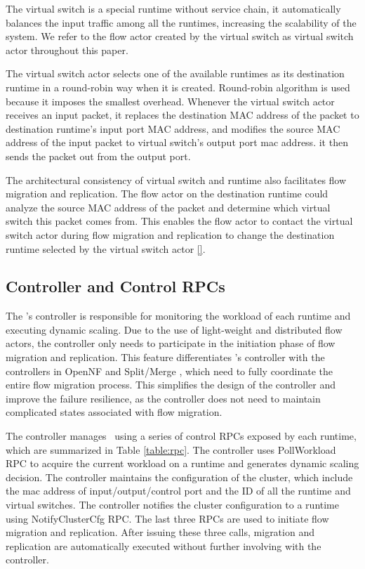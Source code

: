 The virtual switch is a special runtime without service chain, it automatically balances the input traffic among all the runtimes, increasing the scalability of the system. We refer to the flow actor created by the virtual switch as virtual switch actor throughout this paper.

The virtual switch actor selects one of the available runtimes as its destination runtime in a round-robin way when it is created. Round-robin algorithm is used because it imposes the smallest overhead. Whenever the virtual switch actor receives an input packet, it replaces the destination MAC address of the packet to destination runtime's input port MAC address, and modifies the source MAC address of the input packet to virtual switch's output port mac address. it then sends the packet out from the output port.

The architectural consistency of virtual switch and runtime also facilitates flow migration and replication. The flow actor on the destination runtime could analyze the source MAC address of the packet and determine which virtual switch this packet comes from. This enables the flow actor to contact the virtual switch actor during flow migration and replication to change the destination runtime selected by the virtual switch actor \ref{}.

\subsection{Controller and Control RPCs}
\label{sec:controller}


The \nfactor's controller is responsible for monitoring the workload of each runtime and executing dynamic scaling. Due to the use of light-weight and distributed flow actors, the controller only needs to participate in the initiation phase of flow migration and replication. This feature differentiates \nfactor's controller with the controllers in OpenNF \cite{gember2015opennf} and Split/Merge \cite{rajagopalan2013split}, which need to fully coordinate the entire flow migration process. This simplifies the design of the controller and improve the failure resilience, as the controller does not need to maintain complicated states associated with flow migration.

The controller manages \nfactor~using a series of control RPCs exposed by each runtime, which are summarized in Table \ref{table:rpc}. The controller uses PollWorkload RPC to acquire the current workload on a runtime and generates dynamic scaling decision. The controller maintains the configuration of the cluster, which include the mac address of input/output/control port and the ID of all the runtime and virtual switches. The controller notifies the cluster configuration to a runtime using NotifyClusterCfg RPC. The last three RPCs are used to initiate flow migration and replication. After issuing these three calls, migration and replication are automatically executed without further involving with the controller.

